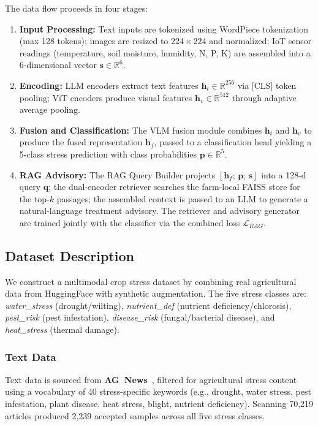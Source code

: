 \documentclass[10pt,journal,compsoc]{IEEEtran}
\begin{document}
The data flow proceeds in four stages:
\begin{enumerate}
    \item \textbf{Input Processing:} Text inputs are tokenized using WordPiece tokenization (max 128 tokens); images are resized to $224 \times 224$ and normalized; IoT sensor readings (temperature, soil moisture, humidity, N, P, K) are assembled into a 6-dimensional vector $\mathbf{s} \in \mathbb{R}^{6}$.

    \item \textbf{Encoding:} LLM encoders extract text features $\mathbf{h}_t \in \mathbb{R}^{256}$ via [CLS] token pooling; ViT encoders produce visual features $\mathbf{h}_v \in \mathbb{R}^{512}$ through adaptive average pooling.

    \item \textbf{Fusion and Classification:} The VLM fusion module combines $\mathbf{h}_t$ and $\mathbf{h}_v$ to produce the fused representation $\mathbf{h}_f$, passed to a classification head yielding a 5-class stress prediction with class probabilities $\mathbf{p} \in \mathbb{R}^{5}$.

    \item \textbf{RAG Advisory:} The RAG Query Builder projects $[\mathbf{h}_f;\,\mathbf{p};\,\mathbf{s}]$ into a 128-d query $\mathbf{q}$; the dual-encoder retriever searches the farm-local FAISS store for the top-$k$ passages; the assembled context is passed to an LLM to generate a natural-language treatment advisory. The retriever and advisory generator are trained jointly with the classifier via the combined loss $\mathcal{L}_{RAG}$.
\end{enumerate}

\subsection{Dataset Description}

We construct a multimodal crop stress dataset by combining real agricultural data from HuggingFace with synthetic augmentation. The five stress classes are: \textit{water\_stress} (drought/wilting), \textit{nutrient\_def} (nutrient deficiency/chlorosis), \textit{pest\_risk} (pest infestation), \textit{disease\_risk} (fungal/bacterial disease), and \textit{heat\_stress} (thermal damage).

\subsubsection{Text Data}
Text data is sourced from \textbf{AG~News}~\cite{zhang2015character}, filtered for agricultural stress content using a vocabulary of 40 stress-specific keywords (e.g., drought, water stress, pest infestation, plant disease, heat stress, blight, nutrient deficiency). Scanning 70,219 articles produced 2,239 accepted samples across all five stress classes.
\end{document}
